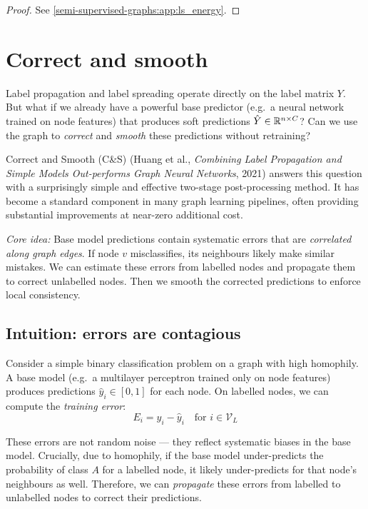 \begin{notechapter}
\begin{proof}
See \cref{semi-supervised-graphs:app:ls_energy}.
\end{proof}

\section{Correct and smooth}
\label{semi-supervised-graphs:sec:cs}

Label propagation and label spreading operate directly on the label matrix
$Y$. But what if we already have a powerful base predictor (e.g.\ a neural
network trained on node features) that produces soft predictions
$\hat{Y} \in \mathbb{R}^{n \times C}$? Can we use the graph to \emph{correct} and
\emph{smooth} these predictions without retraining?

Correct and Smooth (C\&S) (Huang et al., \emph{Combining Label Propagation and Simple Models Out-performs Graph Neural Networks}, 2021) answers this question with a
surprisingly simple and effective two-stage post-processing method. It has
become a standard component in many graph learning pipelines, often providing
substantial improvements at near-zero additional cost.

\begin{intuition}
\emph{Core idea:} Base model predictions contain systematic errors that are
\emph{correlated along graph edges}. If node $v$ misclassifies, its neighbours
likely make similar mistakes. We can estimate these errors from labelled nodes
and propagate them to correct unlabelled nodes. Then we smooth the corrected
predictions to enforce local consistency.
\end{intuition}

\subsection{Intuition: errors are contagious}

Consider a simple binary classification problem on a graph with high homophily.
A base model (e.g.\ a multilayer perceptron trained only on node features)
produces predictions $\hat{y}_i \in [0,1]$ for each node. On labelled nodes, we
can compute the \emph{training error}:
\begin{equation}
E_i = y_i - \hat{y}_i \quad \text{for } i \in \mathcal{V}_L
\end{equation}

These errors are not random noise --- they reflect systematic biases in the base
model. Crucially, due to homophily, if the base model under-predicts the
probability of class $A$ for a labelled node, it likely under-predicts for that
node's neighbours as well. Therefore, we can \emph{propagate} these errors
from labelled to unlabelled nodes to correct their predictions.


\end{notechapter}
